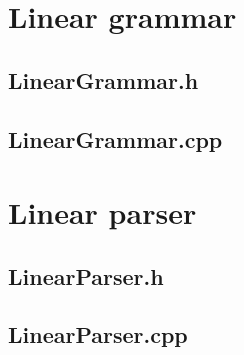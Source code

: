 \section*{Linear grammar}

\subsection*{LinearGrammar.h}


\subsection*{LinearGrammar.cpp}


\section*{Linear parser}

\subsection*{LinearParser.h}


\subsection*{LinearParser.cpp}


